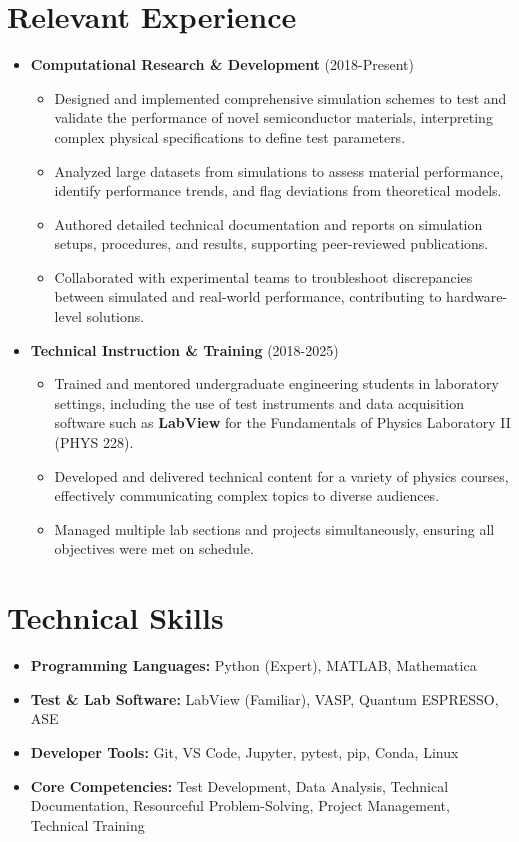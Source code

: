 \documentclass[letter,11pt]{article}
\begin{document}
\section{Relevant Experience}
\begin{itemize}
    \item \textbf{Computational Research \& Development} (2018-Present)
        \begin{itemize}
            \item Designed and implemented comprehensive simulation schemes to test and validate the performance of novel semiconductor materials, interpreting complex physical specifications to define test parameters.
            \item Analyzed large datasets from simulations to assess material performance, identify performance trends, and flag deviations from theoretical models.
            \item Authored detailed technical documentation and reports on simulation setups, procedures, and results, supporting peer-reviewed publications.
            \item Collaborated with experimental teams to troubleshoot discrepancies between simulated and real-world performance, contributing to hardware-level solutions.
        \end{itemize}
    \vspace{2mm}
    \item \textbf{Technical Instruction \& Training} (2018-2025)
        \begin{itemize}
            \item Trained and mentored undergraduate engineering students in laboratory settings, including the use of test instruments and data acquisition software such as \textbf{LabView} for the Fundamentals of Physics Laboratory II (PHYS 228).
            \item Developed and delivered technical content for a variety of physics courses, effectively communicating complex topics to diverse audiences.
            \item Managed multiple lab sections and projects simultaneously, ensuring all objectives were met on schedule.
        \end{itemize}
\end{itemize}

\section{Technical Skills}
\begin{itemize}
    \item \textbf{Programming Languages:} Python (Expert), MATLAB, Mathematica
    \item \textbf{Test \& Lab Software:} LabView (Familiar), VASP, Quantum ESPRESSO, ASE
    \item \textbf{Developer Tools:} Git, VS Code, Jupyter, pytest, pip, Conda, Linux
    \item \textbf{Core Competencies:} Test Development, Data Analysis, Technical Documentation, Resourceful Problem-Solving, Project Management, Technical Training
\end{itemize}
\end{document}
